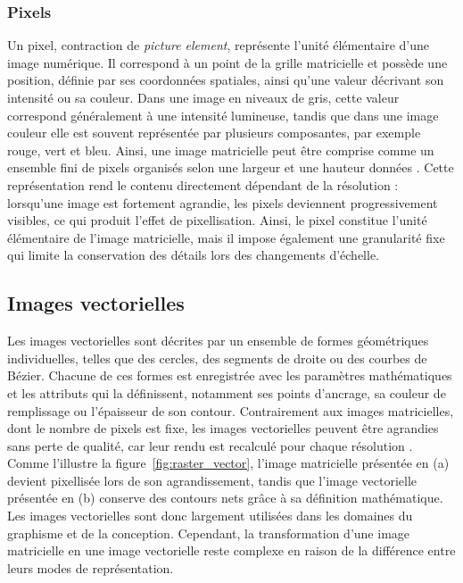 \documentclass[12pt, a4paper, oneside]{report}
\begin{document}
    \subsubsection{Pixels}
    Un pixel, contraction de \textit{picture element}, représente l'unité élémentaire d'une image numérique. Il correspond à un point de la grille matricielle et possède une position, définie par ses coordonnées spatiales, ainsi qu'une valeur décrivant son intensité ou sa couleur. Dans une image en niveaux de gris, cette valeur correspond généralement à une intensité lumineuse, tandis que dans une image couleur elle est souvent représentée par plusieurs composantes, par exemple rouge, vert et bleu. Ainsi, une image matricielle peut être comprise comme un ensemble fini de pixels organisés selon une largeur et une hauteur données \cite{gonzalez2018digital}. Cette représentation rend le contenu directement dépendant de la résolution : lorsqu'une image est fortement agrandie, les pixels deviennent progressivement visibles, ce qui produit l'effet de pixellisation. Ainsi, le pixel constitue l'unité élémentaire de l'image matricielle, mais il impose également une granularité fixe qui limite la conservation des détails lors des changements d'échelle.
    
\subsection{Images vectorielles}

Les images vectorielles sont décrites par un ensemble de formes géométriques individuelles, telles que des cercles, des segments de droite ou des courbes de Bézier. Chacune de ces formes est enregistrée avec les paramètres mathématiques et les attributs qui la définissent, notamment ses points d'ancrage, sa couleur de remplissage ou l'épaisseur de son contour. Contrairement aux images matricielles, dont le nombre de pixels est fixe, les images vectorielles peuvent être agrandies sans perte de qualité, car leur rendu est recalculé pour chaque résolution \cite{foley1996computer}. Comme l'illustre la figure~\ref{fig:raster_vector}, l'image matricielle présentée en (a) devient pixellisée lors de son agrandissement, tandis que l'image vectorielle présentée en (b) conserve des contours nets grâce à sa définition mathématique. Les images vectorielles sont donc largement utilisées dans les domaines du graphisme et de la conception. Cependant, la transformation d'une image matricielle en une image vectorielle reste complexe en raison de la différence entre leurs modes de représentation.
\end{document}
